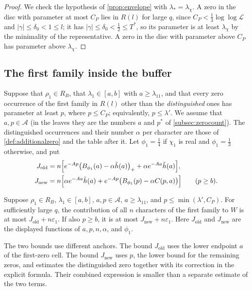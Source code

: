 \documentclass[11pt]{amsart}
\numberwithin{equation}{section}
\theoremstyle{plain}
\theoremstyle{definition}
\theoremstyle{remark}
\newcommand{\LL}{\mathcal{L}}
\newcommand{\eps}{\varepsilon}
\newcommand{\1}{\mathbf{1}}
\begin{document}
\begin{proof}
We check the hypothesis of \cref{prop:envelope} with $\lambda_*=\lambda_\chi$. A zero in the disc
with parameter at most $C_P$ lies in $R(l)$ for large $q$, since $C_P<\frac13\log\log\LL$ and
$|\gamma|\le\delta_0<1\le l$; it has $|\gamma|\le\delta_0<\frac12\le T^*$, so its parameter is at least
$\lambda_\chi$ by the minimality of the representative. A zero in the disc with parameter
above $C_P$ has parameter above $\lambda_\chi$.
\end{proof}

\subsection{The first family inside the buffer}\label{subsec:firstinside}
Suppose that $\rho_1\in R_B$, that $\lambda_1\in[a,b]$ with $a\ge\lambda_{11}$, and that every zero
occurrence of the first family in $R(l)$ other than the \emph{distinguished} ones has parameter at
least $p$, where $p\le C_P$; equivalently, $p\le\lambda'$. We assume that $a,p\in\mathcal A$ (in the leaves they are
the numbers $a$ and $p^*$ of \cref{subsec:zerocount}). The distinguished occurrences and their
number $\alpha$ per character are those of \cref{def:additionalzero} and the table after it. Let $\phi_1=\frac14$ if $\chi_1$ is real and $\phi_1=\frac13$ otherwise, and put
\begin{align*}
  J_{\mathrm{old}}&=n\Bigl[e^{-Ap}\bigl(B_{\phi_1}(a)-\alpha\tilde h(a)\bigr)_++\alpha e^{-Aa}\tilde h(a)\Bigr],\\
  J_{\mathrm{new}}&=n\Bigl[\alpha e^{-Aa}\tilde h(a)+e^{-Ap}\bigl(B_{\phi_1}(p)-\alpha C(p,a)\bigr)\Bigr]
  \qquad(p\ge b).
\end{align*}

\begin{proposition}\label{prop:firstinside}
Suppose $\rho_1\in R_B$, $\lambda_1\in[a,b]$, $a,p\in\mathcal A$,
$a\ge\lambda_{11}$, and $p\le\min(\lambda',C_P)$.
For sufficiently large $q$, the contribution of all $n$ characters of the first family
to $W$ is at most $J_{\mathrm{old}}+n\eps_1$. If also $p\ge b$, it is at most
$J_{\mathrm{new}}+n\eps_1$. Here $J_{\mathrm{old}}$ and $J_{\mathrm{new}}$ are the displayed
functions of $a,p,n,\alpha$, and $\phi_1$.
\end{proposition}

The two bounds use different anchors. The bound $J_{\mathrm{old}}$ uses the lower endpoint
$a$ of the first-zero cell. The bound $J_{\mathrm{new}}$ uses $p$, the lower bound for the
remaining zeros, and estimates the distinguished zero together with its correction in
the explicit formula. Their combined expression is smaller than a separate estimate
of the two terms.
\end{document}
